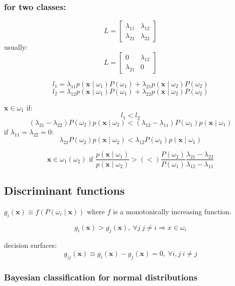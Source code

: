 \documentclass{article}
\begin{document}
\begin{multicols}{2}
\subsubsection*{for two classes:}
\[L = \begin{bmatrix}
	\lambda_{11} & \lambda_{12} \\
	\lambda_{21} & \lambda_{22}
\end{bmatrix}\]
usually:
\[L = \begin{bmatrix}
	0 & \lambda_{12} \\
	\lambda_{21} & 0
\end{bmatrix}\]

\[l_1 = \lambda_{11} p(\symbf{x} \mid \omega_1)P(\omega_1) + \lambda_{21} p(\symbf{x} \mid \omega_2)P(\omega_2)\]
\[l_2 = \lambda_{12} p(\symbf{x} \mid \omega_1)P(\omega_1) + \lambda_{22} p(\symbf{x} \mid \omega_2)P(\omega_2)\]

$\symbf{x} \in \omega_1$ if:
\[l_1 < l_2\]
\[(\lambda_{21}-\lambda_{22}) P(\omega_2) p(\symbf{x} \mid \omega_2) < (\lambda_{12}-\lambda_{11}) P(\omega_1) p(\symbf{x} \mid \omega_1)\]
if $\lambda_{11} = \lambda_{22} = 0$:
\[\lambda_{21} P(\omega_2) p(\symbf{x} \mid \omega_2) < \lambda_{12} P(\omega_1) p(\symbf{x} \mid \omega_1)\]

\[\symbf{x} \in \omega_1 (\omega_2) \text{ if } \frac{p(\symbf{x} \mid \omega_1)}{p(\symbf{x} \mid \omega_2)} > (<) \frac{P(\omega_2)}{P(\omega_1)}\frac{\lambda_{21}-\lambda_{22}}{\lambda_{12}-\lambda_{11}}\]

\subsection{Discriminant functions}
$g_i (\symbf{x}) \equiv f(P(\omega_i \mid \symbf{x}))$ where $f$ is a monotonically increasing function.

\[g_i(\symbf{x}) > g_j(\symbf{x}),\ \forall j\ j \neq i \Rightarrow x \in \omega_i\]

decision surfaces:
\[g_{ij}(\symbf{x}) \equiv g_i(\symbf{x}) - g_j(\symbf{x}) = 0,\ \forall i, j\ i \neq j\]

\subsubsection*{Bayesian classification for normal distributions}


\end{multicols}
\end{document}
